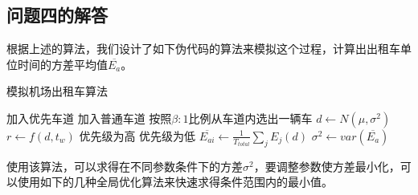 \documentclass{cumcm}
\begin{document}
\subsection{问题四的解答}
根据上述的算法，我们设计了如下伪代码的算法来模拟这个过程，计算出出租车单位时间的方差平均值$\overline{E_a}$。
\renewcommand{\algorithmicrequire}{\textbf{Input:}} 
\renewcommand{\algorithmicensure}{\textbf{Output:}}
\begin{algorithm} [H] 
	\caption{模拟机场出租车算法} %
	\label{al:problem4} %
	\begin{algorithmic}[1] %
		\STATE 加入优先车道
		\ELSE
		\STATE 加入普通车道
		\ENDIF
		\STATE 按照$\beta:1$比例从车道内选出一辆车
		\STATE $d\leftarrow N(\mu,\sigma^2)$
		\STATE $r\leftarrow f(d,t_w)$
		\STATE 优先级为高
		\ELSE
		\STATE 优先级为低
		\ENDIF
		\ELSE
		\STATE $\overline{E_{ai}}\leftarrow \frac{1}{T_{total}}\sum\limits_j E_j(d)$
		\ENDIF
		\ENDWHILE
		\STATE $\sigma^2\leftarrow var(\overline{E_a})$
	\end{algorithmic} 
\end{algorithm}
使用该算法，可以求得在不同参数条件下的方差$\sigma^2$，要调整参数使方差最小化，可以使用如下的几种全局优化算法来快速求得条件范围内的最小值。
\end{document}
